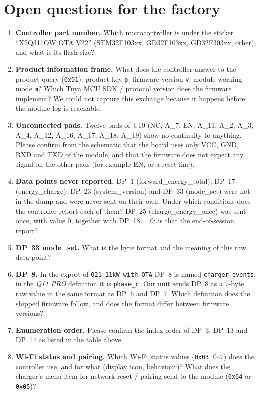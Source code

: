\documentclass[11pt,a4paper]{article}
\newcommand{\hx}[1]{\texttt{#1}}
\begin{document}
\section{Open questions for the factory}

\begin{enumerate}
\item \textbf{Controller part number.} Which microcontroller is under the sticker ``X2Q311OW OTA V22'' (STM32F103xx, GD32F103xx, GD32F303xx, other), and what is its flash size?
\item \textbf{Product information frame.} What does the controller answer to the product query (\hx{0x01}): product key \texttt{p}, firmware version \texttt{v}, module working mode \texttt{m}? Which Tuya MCU SDK / protocol version does the firmware implement? We could not capture this exchange because it happens before the module log is reachable.
\item \textbf{Unconnected pads.} Twelve pads of U10 (NC, A\_7, EN, A\_11, A\_2, A\_3, A\_4, A\_12, A\_16, A\_17, A\_18, A\_19) show no continuity to anything. Please confirm from the schematic that the board uses only VCC, GND, RXD and TXD of the module, and that the firmware does not expect any signal on the other pads (for example EN, or a reset line).
\item \textbf{Data points never reported.} DP~1 (forward\_energy\_total), DP~17 (energy\_charge), DP~23 (system\_version) and DP~33 (mode\_set) were not in the dump and were never sent on their own. Under which conditions does the controller report each of them? DP~25 (charge\_energy\_once) was sent once, with value 0, together with DP~18 = 0: is that the end-of-session report?
\item \textbf{DP~33 mode\_set.} What is the byte format and the meaning of this raw data point?
\item \textbf{DP~8.} In the export of \texttt{Q21\_11kW\_with\_OTA} DP~8 is named \texttt{charger\_events}, in the \emph{Q11 PRO} definition it is \texttt{phase\_c}. Our unit sends DP~8 as a 7-byte raw value in the same format as DP~6 and DP~7. Which definition does the shipped firmware follow, and does the format differ between firmware versions?
\item \textbf{Enumeration order.} Please confirm the index order of DP~3, DP~13 and DP~14 as listed in the table above.
\item \textbf{Wi-Fi status and pairing.} Which Wi-Fi status values (\hx{0x03}, 0--7) does the controller use, and for what (display icon, behaviour)? What does the charger's menu item for network reset / pairing send to the module (\hx{0x04} or \hx{0x05})?

\end{enumerate}
\end{document}
